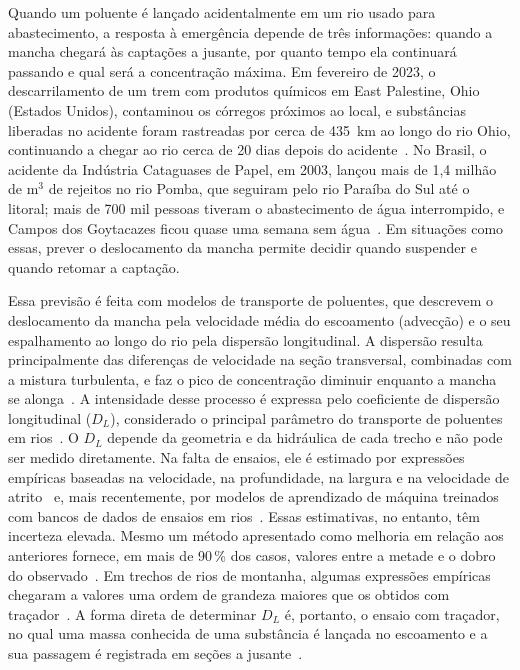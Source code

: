 \documentclass[12pt,a4paper]{article}
\begin{document}
\label{sec:introducao}

Quando um poluente é lançado acidentalmente em um rio usado para abastecimento, a resposta à emergência depende de três informações: quando a mancha chegará às captações a jusante, por quanto tempo ela continuará passando e qual será a concentração máxima. Em fevereiro de 2023, o descarrilamento de um trem com produtos químicos em East Palestine, Ohio (Estados Unidos), contaminou os córregos próximos ao local, e substâncias liberadas no acidente foram rastreadas por cerca de 435~km ao longo do rio Ohio, continuando a chegar ao rio cerca de 20 dias depois do acidente~\cite{coelho2024}. No Brasil, o acidente da Indústria Cataguases de Papel, em 2003, lançou mais de 1,4 milhão de m$^3$ de rejeitos no rio Pomba, que seguiram pelo rio Paraíba do Sul até o litoral; mais de 700 mil pessoas tiveram o abastecimento de água interrompido, e Campos dos Goytacazes ficou quase uma semana sem água~\cite{miquelito2014}. Em situações como essas, prever o deslocamento da mancha permite decidir quando suspender e quando retomar a captação.

Essa previsão é feita com modelos de transporte de poluentes, que descrevem o deslocamento da mancha pela velocidade média do escoamento (advecção) e o seu espalhamento ao longo do rio pela dispersão longitudinal. A dispersão resulta principalmente das diferenças de velocidade na seção transversal, combinadas com a mistura turbulenta, e faz o pico de concentração diminuir enquanto a mancha se alonga~\cite{taylor1954,fischer1979}. A intensidade desse processo é expressa pelo coeficiente de dispersão longitudinal ($D_L$), considerado o principal parâmetro do transporte de poluentes em rios~\cite{kargar2020,goliatt2021}. O $D_L$ depende da geometria e da hidráulica de cada trecho e não pode ser medido diretamente. Na falta de ensaios, ele é estimado por expressões empíricas baseadas na velocidade, na profundidade, na largura e na velocidade de atrito~\cite{fischer1975,seo1998} e, mais recentemente, por modelos de aprendizado de máquina treinados com bancos de dados de ensaios em rios~\cite{kargar2020,goliatt2021}. Essas estimativas, no entanto, têm incerteza elevada. Mesmo um método apresentado como melhoria em relação aos anteriores fornece, em mais de 90\,\% dos casos, valores entre a metade e o dobro do observado~\cite{deng2002}. Em trechos de rios de montanha, algumas expressões empíricas chegaram a valores uma ordem de grandeza maiores que os obtidos com traçador~\cite{castillo2022}. A forma direta de determinar $D_L$ é, portanto, o ensaio com traçador, no qual uma massa conhecida de uma substância é lançada no escoamento e a sua passagem é registrada em seções a jusante~\cite{fischer1979}.
\end{document}

